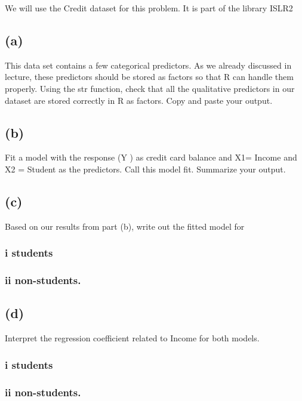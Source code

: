 \documentclass[
]{article}
\begin{document}
We will use the Credit dataset for this problem. It is part of the
library ISLR2

\subsection{(a)}\label{a-2}

This data set contains a few categorical predictors. As we already
discussed in lecture, these predictors should be stored as factors so
that R can handle them properly. Using the str function, check that all
the qualitative predictors in our dataset are stored correctly in R as
factors. Copy and paste your output.

\subsection{(b)}\label{b-2}

Fit a model with the response (Y ) as credit card balance and X1= Income
and X2 = Student as the predictors. Call this model fit. Summarize your
output.

\subsection{(c)}\label{c-1}

Based on our results from part (b), write out the fitted model for

\subsubsection{i students}\label{i-students}

\subsubsection{ii non-students.}\label{ii-non-students.}

\subsection{(d)}\label{d-1}

Interpret the regression coefficient related to Income for both models.

\subsubsection{i students}\label{i-students-1}

\subsubsection{ii non-students.}\label{ii-non-students.-1}
\end{document}
